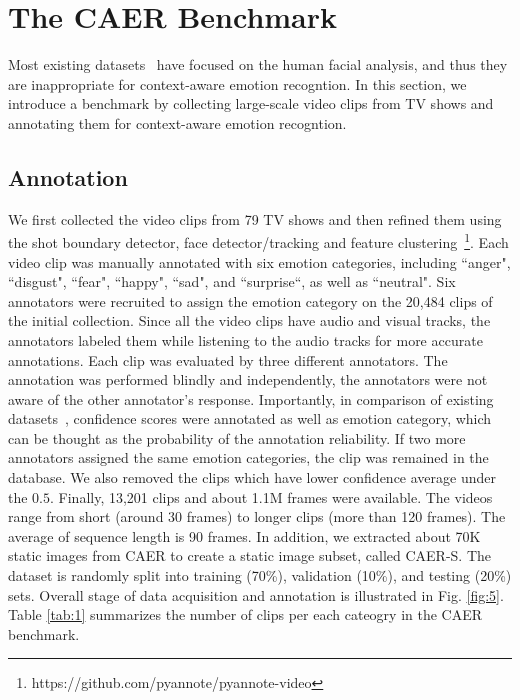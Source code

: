 \documentclass[10pt,twocolumn,letterpaper]{article}
\newcommand{\figref}[1]{Fig. \ref{#1}}
\newcommand{\tabref}[1]{Table \ref{#1}}
\begin{document}
\section{The CAER Benchmark}\label{sec:4}
Most existing datasets~\cite{goodfellow2013challenges, mollahosseiniaffectnet} have focused on the human facial analysis, and thus they are inappropriate for context-aware emotion recogntion.
In this section, we introduce a benchmark by collecting large-scale video clips from TV shows and annotating them for context-aware emotion recogntion.

\subsection{Annotation}\label{sec:41}
We first collected the video clips from 79 TV shows and then refined them using the shot boundary detector, face detector/tracking and feature clustering~\footnote{https://github.com/pyannote/pyannote-video}. Each video clip was manually annotated with six emotion categories, including ``anger", ``disgust", ``fear", ``happy", ``sad", and ``surprise``, as well as ``neutral".
Six annotators were recruited to assign the emotion category on the 20,484 clips of the initial collection.
Since all the video clips have audio and visual tracks, the annotators labeled them while listening to the audio tracks for more accurate annotations. Each clip was evaluated by three different annotators.
The annotation was performed blindly and independently, \ie the annotators were not aware of the other annotator's response.
Importantly, in comparison of existing datasets~\cite{dhall2011acted,kosti2017emotion}, confidence scores were annotated as well as emotion category, which can be thought as the probability of the annotation reliability.
If two more annotators assigned the same emotion categories, the clip was remained in the database.
We also removed the clips which have lower confidence average under the $0.5$.
Finally, 13,201 clips and about 1.1M frames were available. The videos range from short (around 30 frames) to longer clips (more than 120 frames).
The average of sequence length is 90 frames.
In addition, we extracted about 70K static images from CAER to create a static image subset, called CAER-S. The dataset is randomly split into training (70\%), validation (10\%), and testing (20\%) sets.
Overall stage of data acquisition and annotation is illustrated in \figref{fig:5}. \tabref{tab:1} summarizes the number of clips per each cateogry in the CAER benchmark.
\end{document}
